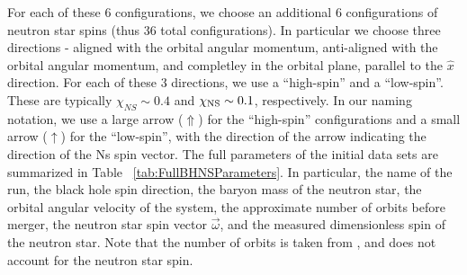 For each of these 6
configurations, we choose an additional 6 configurations of neutron
star spins (thus 36 total configurations). In particular we choose
three directions - aligned with the orbital angular momentum,
anti-aligned with the orbital angular momentum, and completley in the
orbital plane, parallel to the $\hat{x}$ direction. For each of these
3 directions, we use a ``high-spin'' and a ``low-spin''. These are
typically $\chi_{NS}\sim 0.4$ and $\chi_{\rm NS}\sim 0.1$,
respectively. In our naming notation, we use a large arrow
($\Uparrow$)  for the ``high-spin'' configurations and a small arrow
($\uparrow$) for the ``low-spin'', with the direction of the arrow
indicating the direction of the Ns spin vector. The full parameters of
the initial data sets are summarized in Table
~\ref{tab:FullBHNSParameters}. In particular, the name of the run,
the black hole spin direction, the baryon mass of the neutron star, the orbital angular velocity of the system,
the approximate number of orbits before merger, the neutron star spin vector $\vec{\omega}$, and the measured dimensionless
spin of the neutron star. Note that the number of orbits is taken from
\cite{Foucart:2013a}, and does not account for the neutron star
spin. 

